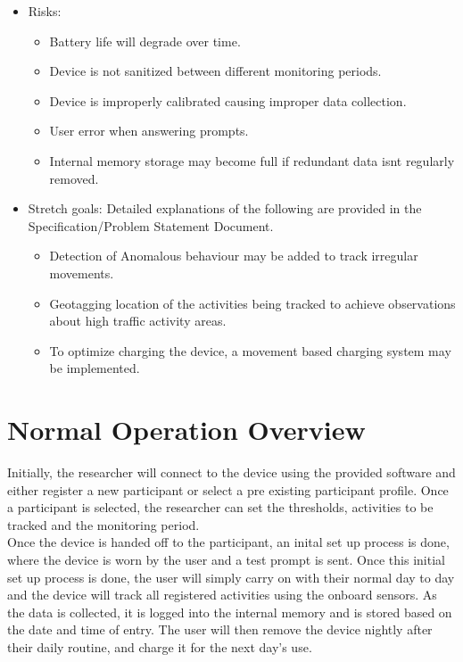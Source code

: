 \documentclass[12pt]{article}
\begin{document}
\begin{itemize}
\item Risks:
	\begin{itemize}
		\item Battery life will degrade over time.
		\item Device is not sanitized between different monitoring periods.
		\item Device is improperly calibrated causing improper data collection.
		\item User error when answering prompts.
		\item Internal memory storage may become full if redundant data isnt regularly removed.
	\end{itemize}

\item Stretch goals: Detailed explanations of the following are provided in the Specification/Problem Statement Document.
	\begin{itemize}
		\item Detection of Anomalous behaviour may be added to track irregular movements.
		\item Geotagging location of the activities being tracked to achieve observations about high traffic activity areas.
		\item To optimize charging the device, a movement based charging system may be implemented.
	\end{itemize}
\end{itemize}

\section{Normal Operation Overview}
\label{NOO}
\setlength{\parindent}{20pt}
Initially, the researcher will connect to the device using the provided software and either register a new participant or select a pre existing participant profile. Once a participant is selected, the researcher can set the thresholds, activities to be tracked and the monitoring period. \\

Once the device is handed off to the participant, an inital set up process is done, where the device is worn by the user and a test prompt is sent. Once this initial set up process is done, the user will simply carry on with their normal day to day and the device will track all registered activities using the onboard sensors. As the data is collected, it is logged into the internal memory and is stored based on the date and time of entry. The user will then remove the device nightly after their daily routine, and charge it for the next day's use.\\
\end{document}
